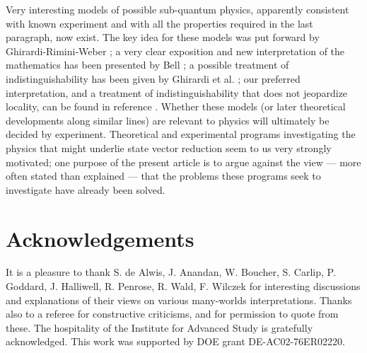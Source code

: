 \documentclass[aps,pra,12pt]{revtex4}
\begin{document}
Very interesting models of possible 
sub-quantum physics, apparently consistent with known experiment and
with all the properties required in
the last paragraph, now exist.  The key idea for these models was put
forward by Ghirardi-Rimini-Weber \cite{grw}; a very clear exposition and
new interpretation of the mathematics has been presented by Bell \cite{bell3};
a possible treatment of indistinguishability 
has been given by Ghirardi et al. \cite{gnrw} ;
our preferred interpretation, and a treatment of indistinguishability that
does not jeopardize locality, can be found in reference \cite{ak}. 
Whether these models (or later theoretical developments along similar
lines) are relevant to physics will ultimately be decided by
experiment. 
Theoretical and experimental programs investigating
the physics that might underlie state vector reduction seem to us very strongly
motivated; one purpose of the present article is to argue against
the view --- more often stated than explained --- 
that the problems these programs seek to investigate have already
been solved.  

\section{Acknowledgements}

It is a pleasure to thank S. de Alwis, J. Anandan, W. Boucher, S. Carlip, 
P. Goddard, J. Halliwell, R. Penrose, R. Wald, F. Wilczek 
for interesting discussions and explanations of their views on various
many-worlds interpretations.
Thanks also to a referee for constructive criticisms, and for
permission to quote from these. 
The hospitality of the Institute for Advanced Study is gratefully 
acknowledged. This work was supported by DOE grant DE-AC02-76ER02220. 
\end{document}

